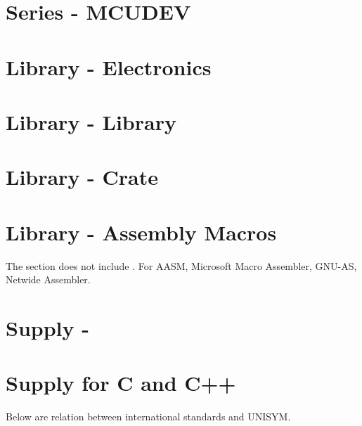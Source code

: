 \section{Series \mbox{-} {MCUDEV}}

\section{Library \mbox{-} Electronics}

\section{Library \mbox{-}  Library}

\section{Library \mbox{-}  Crate}

\section{Library \mbox{-} Assembly Macros}

The section does not include . For AASM, Microsoft Macro Assembler, GNU-AS, Netwide Assembler.

\section{Supply \mbox{-} }

\section{Supply for C and C++}

Below are relation between international standards and UNISYM.

